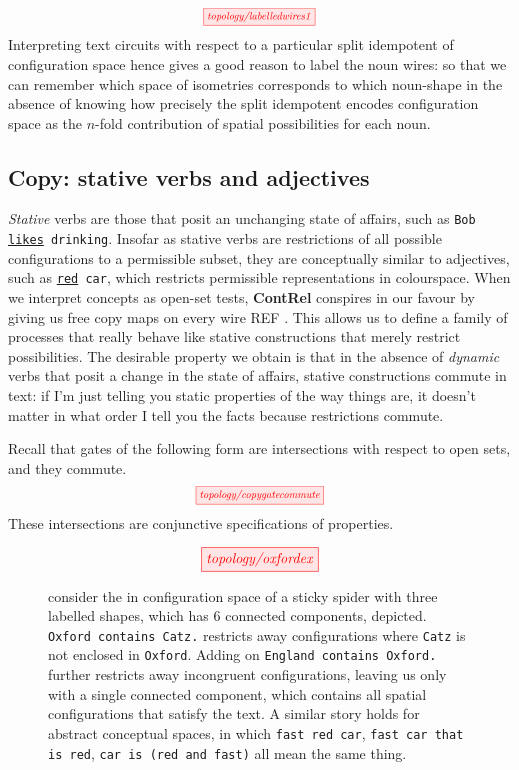\[\scalebox{0.75}{\tikzfig{topology/labelledwires1}}\]
Interpreting text circuits with respect to a particular split idempotent of configuration space hence gives a good reason to label the noun wires: so that we can remember which space of isometries corresponds to which noun-shape in the absence of knowing how precisely the split idempotent encodes configuration space as the $n$-fold contribution of spatial possibilities for each noun.

\subsection{Copy: stative verbs and adjectives}

\emph{Stative} verbs are those that posit an unchanging state of affairs, such as \texttt{Bob \underline{likes} drinking}. Insofar as stative verbs are restrictions of all possible configurations to a permissible subset, they are conceptually similar to adjectives, such as \texttt{\underline{red} car}, which restricts permissible representations in colourspace. When we interpret concepts as open-set tests, \textbf{ContRel} conspires in our favour by giving us free copy maps on every wire \bR REF \e. This allows us to define a family of processes that really behave like stative constructions that merely restrict possibilities. The desirable property we obtain is that in the absence of \emph{dynamic} verbs that posit a change in the state of affairs, stative constructions commute in text: if I'm just telling you static properties of the way things are, it doesn't matter in what order I tell you the facts because restrictions commute.

\begin{example}
Recall that gates of the following form are intersections with respect to open sets, and they commute.
\[\scalebox{0.75}{\tikzfig{topology/copygatecommute}}\]
These intersections are conjunctive specifications of properties. 
\begin{figure}[h!]
\[\scalebox{1}{\tikzfig{topology/oxfordex}}\]
\caption{
consider the in configuration space of a sticky spider with three labelled shapes, which has 6 connected components, depicted. \texttt{Oxford contains Catz.} restricts away configurations where \texttt{Catz} is not enclosed in \texttt{Oxford}. Adding on \texttt{England contains Oxford.} further restricts away incongruent configurations, leaving us only with a single connected component, which contains all spatial configurations that satisfy the text. A similar story holds for abstract conceptual spaces, in which \texttt{fast red car}, \texttt{fast car that is red}, \texttt{car is (red and fast)} all mean the same thing.
}
\end{figure}
\end{example}

